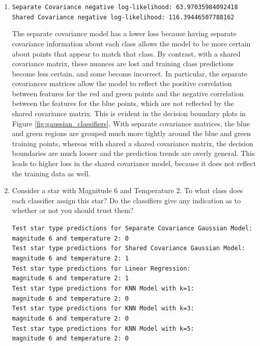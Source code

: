 \documentclass[submit]{harvardml}
\begin{document}
\begin{enumerate}
	\item 
	\texttt{Separate Covariance negative log-likelihood: 63.97035984092418 \\
	Shared Covariance negative log-likelihood: 116.39446507788162}
	
	The separate covariance model has a lower loss because having separate covariance information about each class allows the model to be more certain about points that appear to match that class. By contrast, with a shared covariance matrix, these nuances are lost and training class predictions become less certain, and some become incorrect. In particular, the separate covariances matrices allow the model to reflect the positive correlation between features for the red and green points and the negative correlation between the features for the blue points, which are not reflected by the shared covariance matrix. This is evident in the decision boundary plots in Figure \ref{fig:gaussian_classifiers}. With separate covariance matrices, the blue and green regions are grouped much more tightly around the blue and green training points, whereas with shared a shared covariance matrix, the decision boundaries are much looser and the prediction trends are overly general. This leads to higher loss in the shared covariance model, because it does not reflect the training data as well.
	
	\item Consider a star with Magnitude 6 and Temperature 2.
	To what class does each classifier assign this star? Do the
	classifiers give any indication as to whether or not you should
	trust them?
	
	\texttt{Test star type predictions for Separate Covariance Gaussian Model: \\
		magnitude 6 and temperature 2: 0 \\
		Test star type predictions for Shared Covariance Gaussian Model: \\
		magnitude 6 and temperature 2: 1 \\
		Test star type predictions for Linear Regression: \\
		magnitude 6 and temperature 2: 1 \\
		Test star type predictions for KNN Model with k=1: \\
		magnitude 6 and temperature 2: 0 \\
		Test star type predictions for KNN Model with k=3: \\
		magnitude 6 and temperature 2: 0 \\
		Test star type predictions for KNN Model with k=5: \\
		magnitude 6 and temperature 2: 0
	}


\end{enumerate}
\end{document}
